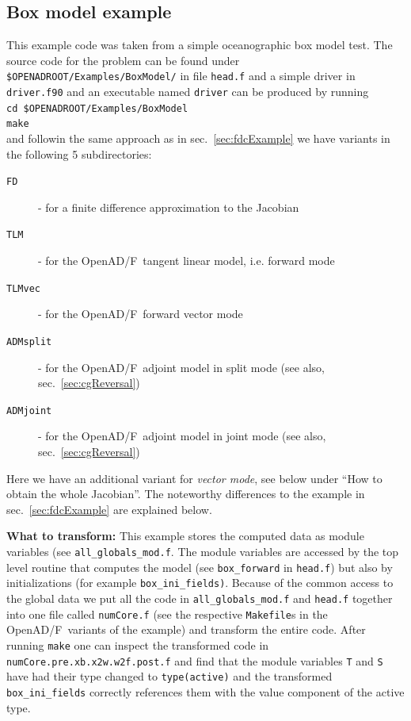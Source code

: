 \documentclass{book}
\newcommand{\OpenADF}{OpenAD/F}
\newcommand{\refsec}[1]{{sec.~\ref{#1}}}
\begin{document}
\subsection{Box model example}\label{sec:boxModelExample}
This example code was taken from a simple oceanographic box model test. 
The source code for the problem can be found under \lstinline{$OPENADROOT/Examples/BoxModel/}%
in file \lstinline{head.f} and a simple driver in \lstinline{driver.f90} and an executable named \lstinline{driver} can be 
produced by running\\[1ex] 
\hspace*{.3cm}\lstinline{cd $OPENADROOT/Examples/BoxModel}\\ %
\hspace*{.3cm}\lstinline{make}\\[1ex]
and followin the same approach as in \refsec{sec:fdcExample} we have 
variants in the following 5 subdirectories:
\begin{description}
\item[\tt FD] - for a finite difference approximation to the Jacobian
\item[\tt TLM] - for the  \OpenADF\ tangent linear model, i.e. forward mode
\item[\tt TLMvec] - for the  \OpenADF\ forward vector mode 
\item[\tt ADMsplit] - for the \OpenADF\ adjoint model in split mode (see also, \refsec{sec:cgReversal})
\item[\tt ADMjoint] - for the \OpenADF\ adjoint model in joint mode (see also, \refsec{sec:cgReversal})
\end{description}
Here we have an 
additional variant for {\em vector mode}, see below under ``How to obtain the whole Jacobian''. 
The noteworthy differences to the example in \refsec{sec:fdcExample} are explained below.
 
\noindent
{\bf What to transform:} This example stores the computed data as module variables (see \lstinline{all_globals_mod.f}.
The module variables are accessed by the top level routine that computes the model (see \lstinline{box_forward} in 
\lstinline{head.f})  but also by initializations  (for example \lstinline{box_ini_fields)}.
Because of the common access to the global data we put all the code in \lstinline{all_globals_mod.f} and 
\lstinline{head.f} together into one file called \lstinline{numCore.f} (see the respective \lstinline{Makefile}s 
in the \OpenADF\ variants of the example)  and transform the entire code. 
After running \lstinline{make} one can inspect the transformed code in \lstinline{numCore.pre.xb.x2w.w2f.post.f}
and find that the module variables \lstinline{T} and \lstinline{S} have had their type changed to 
\lstinline{type(active)} and the 
transformed \lstinline{box_ini_fields} correctly references them with the value component of the active type. 
\end{document}
